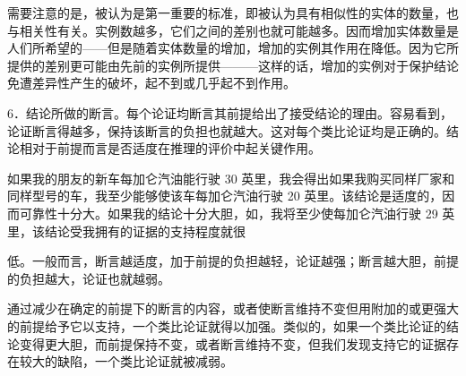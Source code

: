 需要注意的是，被认为是第一重要的标准，即被认为具有相似性的实体的数量，也与相关性有关。实例数越多，它们之间的差别也就可能越多。因而增加实体数量是人们所希望的——但是随着实体数量的增加，增加的实例其作用在降低。因为它所提供的差别更可能由先前的实例所提供———这样的话，增加的实例对于保护结论免遭差异性产生的破坏，起不到或几乎起不到作用。

6．结论所做的断言。每个论证均断言其前提给出了接受结论的理由。容易看到，论证断言得越多，保持该断言的负担也就越大。这对每个类比论证均是正确的。结论相对于前提而言是否适度在推理的评价中起关键作用。

如果我的朋友的新车每加仑汽油能行驶 30 英里，我会得出如果我购买同样厂家和同样型号的车，我至少能够使该车每加仑汽油行驶 20 英里。该结论是适度的，因而可靠性十分大。如果我的结论十分大胆，如，我将至少使每加仑汽油行驶 29 英里，该结论受我拥有的证据的支持程度就很

低。一般而言，断言越适度，加于前提的负担越轻，论证越强；断言越大胆，前提的负担越大，论证也就越弱。

通过减少在确定的前提下的断言的内容，或者使断言维持不变但用附加的或更强大的前提给予它以支持，一个类比论证就得以加强。类似的，如果一个类比论证的结论变得更大胆，而前提保持不变，或者断言维持不变，但我们发现支持它的证据存在较大的缺陷，一个类比论证就被减弱。

